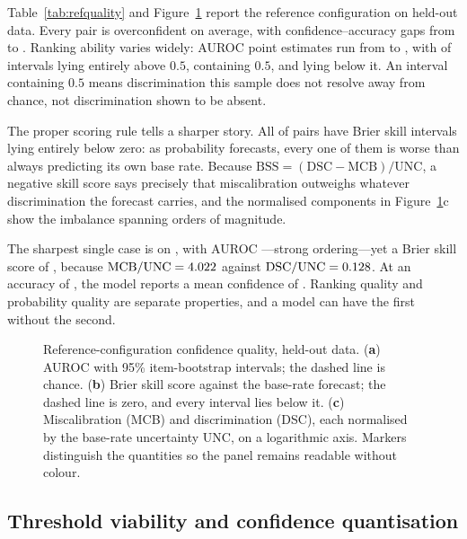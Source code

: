 \documentclass[information,article,submit,moreauthors]{Definitions/mdpi}
\begin{document}
Table~\ref{tab:refquality} and Figure~\ref{fig:refquality} report the reference
configuration on held-out data. Every pair is overconfident on average, with
confidence--accuracy gaps from \MinGap{} to \MaxGap{}. Ranking ability varies
widely: AUROC point estimates run from \MinAuroc{} to \MaxAuroc{}, with
\NumAurocAboveChance{} of \NumQualityPairs{} intervals lying entirely above
$0.5$, \NumAurocContainsChance{} containing $0.5$, and
\NumAurocBelowChance{} lying below it. An interval containing $0.5$ means
discrimination this sample does not resolve away from chance, not
discrimination shown to be absent.

The proper scoring rule tells a sharper story. All \NumBSSBelowZero{} of
\NumQualityPairs{} pairs have Brier skill intervals lying entirely below zero:
as probability forecasts, every one of them is worse than always predicting its
own base rate. Because
$\mathrm{BSS} = (\mathrm{DSC}-\mathrm{MCB})/\mathrm{UNC}$, a negative skill
score says precisely that miscalibration outweighs whatever discrimination the
forecast carries, and the normalised components in
Figure~\ref{fig:refquality}c show the imbalance spanning orders of magnitude.

The sharpest single case is \RankingCaseModel{} on \RankingCaseDataset{}, with
AUROC \RankingCaseAuroc{}---strong ordering---yet a Brier skill score of
\RankingCaseBSS{}, because $\mathrm{MCB}/\mathrm{UNC}=4.022{}$ against
$\mathrm{DSC}/\mathrm{UNC}=0.128{}$. At an accuracy of
\RankingCaseAccuracy{}, the model reports a mean confidence of
\RankingCaseMeanC{}. Ranking quality and probability quality are separate
properties, and a model can have the first without the second.



\begin{figure}[H]
\centering

\caption{Reference-configuration confidence quality, held-out data. (\textbf{a})
AUROC with 95\% item-bootstrap intervals; the dashed line is chance.
(\textbf{b}) Brier skill score against the base-rate forecast; the dashed line
is zero, and every interval lies below it. (\textbf{c}) Miscalibration (MCB) and
discrimination (DSC), each normalised by the base-rate uncertainty UNC, on a
logarithmic axis. Markers distinguish the quantities so the panel remains
readable without colour.\label{fig:refquality}}
\end{figure}

\subsection{Threshold viability and confidence quantisation}
\label{sec:thresholds}
\end{document}
